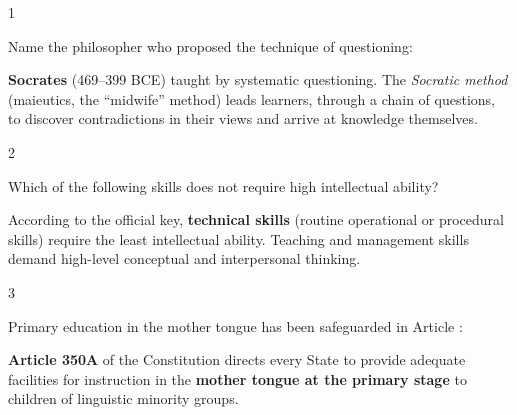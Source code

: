 \begin{question}{1}
{Name the philosopher who proposed the technique of questioning:\par}
\begin{explain}
\textbf{Socrates} (469--399 BCE) taught by systematic questioning. The \emph{Socratic method} (maieutics, the ``midwife'' method) leads learners, through a chain of questions, to discover contradictions in their views and arrive at knowledge themselves.
\end{explain}
\end{question}

\begin{question}{2}
{Which of the following skills does not require high intellectual ability?\par}
\begin{explain}
According to the official key, \textbf{technical skills} (routine operational or procedural skills) require the least intellectual ability. Teaching and management skills demand high-level conceptual and interpersonal thinking.
\end{explain}
\end{question}

\begin{question}{3}
{Primary education in the mother tongue has been safeguarded in Article :\par}
\begin{explain}
\textbf{Article 350A} of the Constitution directs every State to provide adequate facilities for instruction in the \textbf{mother tongue at the primary stage} to children of linguistic minority groups.
\end{explain}
\end{question}

